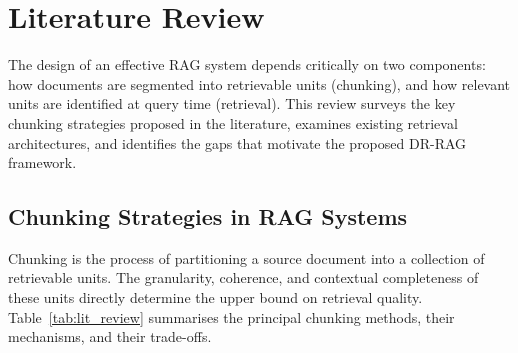 \documentclass[12pt,a4paper]{article}
\begin{document}
\newpage
\section{Literature Review}

The design of an effective RAG system depends critically on two components:
how documents are segmented into retrievable units (chunking), and how
relevant units are identified at query time (retrieval). This review surveys
the key chunking strategies proposed in the literature, examines existing
retrieval architectures, and identifies the gaps that motivate the proposed
DR-RAG framework.

\subsection{Chunking Strategies in RAG Systems}

Chunking is the process of partitioning a source document into a collection
of retrievable units. The granularity, coherence, and contextual completeness
of these units directly determine the upper bound on retrieval quality.
Table~\ref{tab:lit_review} summarises the principal chunking methods, their
mechanisms, and their trade-offs.
\end{document}

